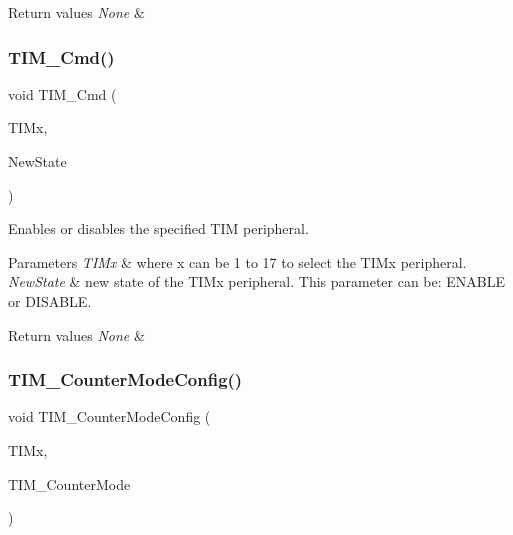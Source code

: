 \begin{DoxyRetVals}{Return values}
{\em None} & \\
\hline
\end{DoxyRetVals}
\mbox{\label{group___t_i_m___exported___functions_ga2bdc275bcbd2ce9d1ba632e6c89896b7}} 
\subsubsection{\texorpdfstring{TIM\_Cmd()}{TIM\_Cmd()}}
{\footnotesize\ttfamily void T\+I\+M\+\_\+\+Cmd (\begin{DoxyParamCaption}\item[{\mbox{\hyperlink{struct_t_i_m___type_def}{T\+I\+M\+\_\+\+Type\+Def}} $\ast$}]{T\+I\+Mx,  }\item[{\mbox{\hyperlink{group___exported__types_gac9a7e9a35d2513ec15c3b537aaa4fba1}{Functional\+State}}}]{New\+State }\end{DoxyParamCaption})}



Enables or disables the specified T\+IM peripheral. 


\begin{DoxyParams}{Parameters}
{\em T\+I\+Mx} & where x can be 1 to 17 to select the T\+I\+Mx peripheral. \\
\hline
{\em New\+State} & new state of the T\+I\+Mx peripheral. This parameter can be\+: E\+N\+A\+B\+LE or D\+I\+S\+A\+B\+LE. \\
\hline
\end{DoxyParams}

\begin{DoxyRetVals}{Return values}
{\em None} & \\
\hline
\end{DoxyRetVals}
\mbox{\label{group___t_i_m___exported___functions_ga93941c1db20bf3794f377307df90a67b}} 
\subsubsection{\texorpdfstring{TIM\_CounterModeConfig()}{TIM\_CounterModeConfig()}}
{\footnotesize\ttfamily void T\+I\+M\+\_\+\+Counter\+Mode\+Config (\begin{DoxyParamCaption}\item[{\mbox{\hyperlink{struct_t_i_m___type_def}{T\+I\+M\+\_\+\+Type\+Def}} $\ast$}]{T\+I\+Mx,  }\item[{uint16\+\_\+t}]{T\+I\+M\+\_\+\+Counter\+Mode }\end{DoxyParamCaption})}



